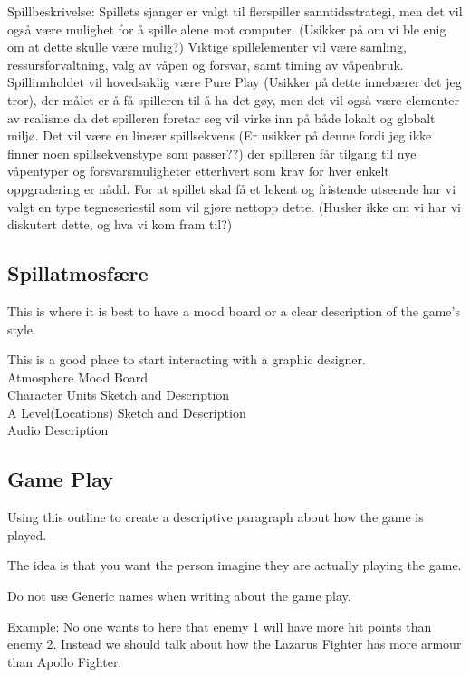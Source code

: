 Spillbeskrivelse: Spillets sjanger er valgt til flerspiller sanntidsstrategi, men det vil også være mulighet for å spille alene mot computer. (Usikker på om vi ble enig om at dette skulle være mulig?) Viktige spillelementer vil være samling, ressursforvaltning, valg av våpen og forsvar, samt timing av våpenbruk. Spillinnholdet vil hovedsaklig være Pure Play (Usikker på dette innebærer det jeg tror), der målet er å få spilleren til å ha det gøy, men det vil også være elementer av realisme da det spilleren foretar seg vil virke inn på både lokalt og globalt miljø. Det vil være en lineær spillsekvens (Er usikker på denne fordi jeg ikke finner noen  spillsekvenstype som passer??) der spilleren får tilgang til nye våpentyper og forsvarsmuligheter etterhvert som krav for hver enkelt oppgradering er nådd. For at spillet skal få et lekent og fristende utseende har vi valgt en type tegneseriestil som vil gjøre nettopp dette. (Husker ikke om vi har vi diskutert dette, og hva vi kom fram til?)\\ 


\subsection{Spillatmosfære}

This is where it is best to have a mood board or a clear description of the game’s style. 

This is a good place to start interacting with a graphic designer.\\

Atmosphere Mood Board\\
Character  Units Sketch and Description\\
A Level(Locations) Sketch and Description\\
Audio Description

\subsection{Game Play}

Using this outline to create a descriptive paragraph about how the game is played. 

The idea is that you want the person imagine they are actually playing the game.

Do not use Generic names when writing about the game play. 

Example: No one wants to here that enemy 1 will have more hit points than enemy 2. Instead we should talk about how the Lazarus Fighter has more armour than Apollo Fighter.

